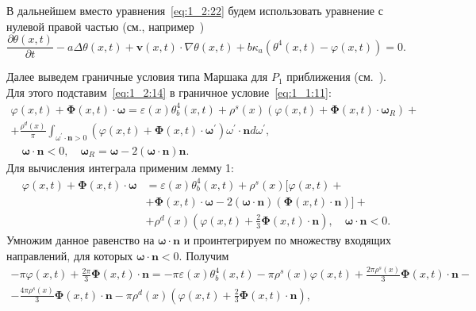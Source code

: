 В дальнейшем вместо уравнения~\eqref{eq:1_2:22} будем использовать уравнение
с нулевой правой частью (см., например~\cite{frank2010optimal})
\begin{equation}
    \label{eq:1_2:23}
    \frac{\partial \theta(x, t)}{\partial t}-a \Delta \theta(x, t)+\mathbf{v}(x, t) \cdot \nabla
    \theta(x, t)+b \kappa_{a}\left(\theta^{4}(x, t)-\varphi(x, t)\right)=0.
\end{equation}

Далее выведем граничные условия типа Маршака для $P_{1}$ приближения (см.\ \cite{Marshak1947}).
Для этого подставим~\eqref{eq:1_2:14} в граничное условие~\eqref{eq:1_1:11}:
\[
    \begin{gathered}
        \varphi(x, t)+\boldsymbol{\Phi}(x, t) \cdot \boldsymbol{\omega}=\varepsilon(x)
        \theta_{b}^{4}(x, t)+\rho^{s}(x)\left(\varphi(x, t)+\boldsymbol{\Phi}(x, t)
        \cdot \boldsymbol{\omega}_{R}\right)+ \\
        +\frac{\rho^{d}(x)}{\pi} \int_{\omega^{\prime} \cdot
        \mathbf{n}>0}\left(\varphi(x, t)+\boldsymbol{\Phi}(x, t) \cdot
        \boldsymbol{\omega}^{\prime}\right) \omega^{\prime} \cdot \mathbf{n} d \omega^{\prime}, \\
        \quad \boldsymbol{\omega} \cdot \mathbf{n}<0, \quad
        \boldsymbol{\omega}_{R}=\boldsymbol{\omega}-2(\boldsymbol{\omega} \cdot
        \mathbf{n}) \mathbf{n}.
    \end{gathered}
\]
Для вычисления интеграла применим лемму 1:
\[
    \begin{aligned}
        \varphi(x, t)+\boldsymbol{\Phi}(x, t) \cdot \boldsymbol{\omega} & =
        \varepsilon(x) \theta_{b}^{4}(x, t)+\rho^{s}(x)[\varphi(x, t) + \\
        &+\boldsymbol{\Phi}(x, t) \cdot \boldsymbol{\omega}-2(\boldsymbol{\omega}
        \cdot \mathbf{n})(\boldsymbol{\Phi}(x, t) \cdot \mathbf{n})]+\\
        &+\rho^{d}(x)\left(\varphi(x, t)+\frac{2}{3} \boldsymbol{\Phi}(x, t)
        \cdot \mathbf{n}\right), \quad \boldsymbol{\omega} \cdot \mathbf{n}<0.
    \end{aligned}
\]
Умножим данное равенство на $\boldsymbol{\omega} \cdot \mathbf{n}$ и проинтегрируем по множеству
входящих направлений, для которых $\boldsymbol{\omega} \cdot \mathbf{n}<0$.
Получим
\[
    \begin{gathered}
        -\pi \varphi(x, t)+\frac{2 \pi}{3} \boldsymbol{\Phi}(x, t) \cdot \mathbf{n}=
        -\pi \varepsilon(x) \theta_{b}^{4}(x, t)-\pi \rho^{s}(x) \varphi(x, t)+\frac{2 \pi \rho^{s}(x)}{3}
        \boldsymbol{\Phi}(x, t) \cdot \mathbf{n}- \\
        -\frac{4 \pi \rho^{s}(x)}{3} \boldsymbol{\Phi}(x, t) \cdot \mathbf{n}-\pi
        \rho^{d}(x)\left(\varphi(x, t)+\frac{2}{3} \boldsymbol{\Phi}(x, t) \cdot \mathbf{n}\right),
    \end{gathered}
\]
